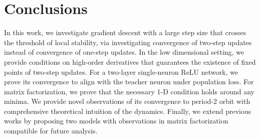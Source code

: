 \documentclass{article}
\theoremstyle{plain}
\theoremstyle{remark}
\newtheorem*{remark}{Remark}
\def\bY{\mathbf{Y}}
\begin{document}

\section{Conclusions}
In this work, we investigate gradient descent with a large step size that crosses the threshold of local stability, via investigating convergence of two-step updates instead of convergence of one-step updates.
In the low dimensional setting, we provide conditions on high-order derivatives that guarantees the existence of fixed points of two-step updates.
For a two-layer single-neuron ReLU network, we prove its convergence to align with the teacher neuron under population loss. 
For matrix factorization, we prove that the necessary 1-D condition holds around any minima. 
We provide novel observations of its convergence to period-2 orbit with comprehensive theoretical intuition of the dynamics.
Finally, we extend previous works by proposing two models with observations in matrix factorization compatible for future analysis.
\end{document}
